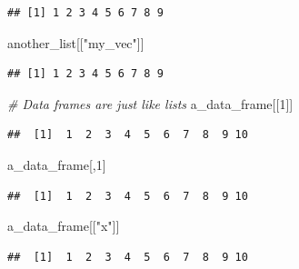 \documentclass[
]{book}
\newenvironment{Shaded}{\begin{snugshade}}{\end{snugshade}}
\newcommand{\CommentTok}[1]{\textcolor[rgb]{0.56,0.35,0.01}{\textit{#1}}}
\newcommand{\DecValTok}[1]{\textcolor[rgb]{0.00,0.00,0.81}{#1}}
\newcommand{\NormalTok}[1]{#1}
\newcommand{\SpecialCharTok}[1]{\textcolor[rgb]{0.81,0.36,0.00}{\textbf{#1}}}
\newcommand{\StringTok}[1]{\textcolor[rgb]{0.31,0.60,0.02}{#1}}
\begin{document}
\begin{enumerate}
\begin{verbatim}
## [1] 1 2 3 4 5 6 7 8 9
\end{verbatim}

\begin{Shaded}
\begin{Highlighting}[]
\NormalTok{another\_list[[}\StringTok{"my\_vec"}\NormalTok{]]}
\end{Highlighting}
\end{Shaded}

\begin{verbatim}
## [1] 1 2 3 4 5 6 7 8 9
\end{verbatim}

\begin{Shaded}
\begin{Highlighting}[]
\CommentTok{\# Data frames are just like lists}
\NormalTok{a\_data\_frame[[}\DecValTok{1}\NormalTok{]]}
\end{Highlighting}
\end{Shaded}

\begin{verbatim}
##  [1]  1  2  3  4  5  6  7  8  9 10
\end{verbatim}

\begin{Shaded}
\begin{Highlighting}[]
\NormalTok{a\_data\_frame[,}\DecValTok{1}\NormalTok{]}
\end{Highlighting}
\end{Shaded}

\begin{verbatim}
##  [1]  1  2  3  4  5  6  7  8  9 10
\end{verbatim}

\begin{Shaded}
\begin{Highlighting}[]
\NormalTok{a\_data\_frame[[}\StringTok{"x"}\NormalTok{]]}
\end{Highlighting}
\end{Shaded}

\begin{verbatim}
##  [1]  1  2  3  4  5  6  7  8  9 10
\end{verbatim}

\begin{Shaded}
\end{Shaded}


\end{enumerate}
\end{document}
